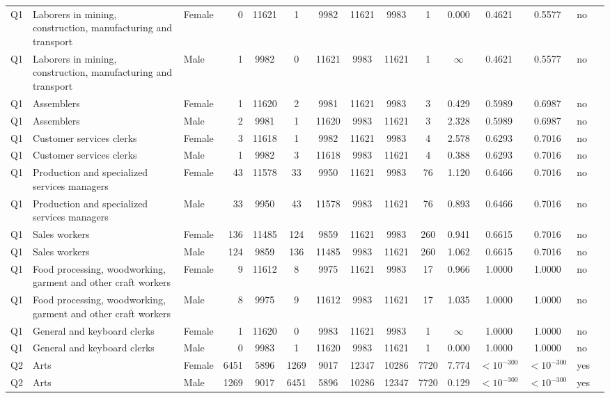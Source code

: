 \begin{longtable}{lllrcccccccccll}
Q1 & Laborers in mining, construction, manufacturing and transport & Female & 0 & 11621 & 1 & 9982 & 11621 & 9983 & 1 & 0.000 & 0.4621 & 0.5577 & no \\
Q1 & Laborers in mining, construction, manufacturing and transport & Male & 1 & 9982 & 0 & 11621 & 9983 & 11621 & 1 & $\infty$ & 0.4621 & 0.5577 & no \\
Q1 & Assemblers & Female & 1 & 11620 & 2 & 9981 & 11621 & 9983 & 3 & 0.429 & 0.5989 & 0.6987 & no \\
Q1 & Assemblers & Male & 2 & 9981 & 1 & 11620 & 9983 & 11621 & 3 & 2.328 & 0.5989 & 0.6987 & no \\
Q1 & Customer services clerks & Female & 3 & 11618 & 1 & 9982 & 11621 & 9983 & 4 & 2.578 & 0.6293 & 0.7016 & no \\
Q1 & Customer services clerks & Male & 1 & 9982 & 3 & 11618 & 9983 & 11621 & 4 & 0.388 & 0.6293 & 0.7016 & no \\
Q1 & Production and specialized services managers & Female & 43 & 11578 & 33 & 9950 & 11621 & 9983 & 76 & 1.120 & 0.6466 & 0.7016 & no \\
Q1 & Production and specialized services managers & Male & 33 & 9950 & 43 & 11578 & 9983 & 11621 & 76 & 0.893 & 0.6466 & 0.7016 & no \\
Q1 & Sales workers & Female & 136 & 11485 & 124 & 9859 & 11621 & 9983 & 260 & 0.941 & 0.6615 & 0.7016 & no \\
Q1 & Sales workers & Male & 124 & 9859 & 136 & 11485 & 9983 & 11621 & 260 & 1.062 & 0.6615 & 0.7016 & no \\
Q1 & Food processing, woodworking, garment and other craft workers & Female & 9 & 11612 & 8 & 9975 & 11621 & 9983 & 17 & 0.966 & 1.0000 & 1.0000 & no \\
Q1 & Food processing, woodworking, garment and other craft workers & Male & 8 & 9975 & 9 & 11612 & 9983 & 11621 & 17 & 1.035 & 1.0000 & 1.0000 & no \\
Q1 & General and keyboard clerks & Female & 1 & 11620 & 0 & 9983 & 11621 & 9983 & 1 & $\infty$ & 1.0000 & 1.0000 & no \\
Q1 & General and keyboard clerks & Male & 0 & 9983 & 1 & 11620 & 9983 & 11621 & 1 & 0.000 & 1.0000 & 1.0000 & no \\
Q2 & Arts & Female & 6451 & 5896 & 1269 & 9017 & 12347 & 10286 & 7720 & 7.774 & $<10^{-300}$ & $<10^{-300}$ & yes \\
Q2 & Arts & Male & 1269 & 9017 & 6451 & 5896 & 10286 & 12347 & 7720 & 0.129 & $<10^{-300}$ & $<10^{-300}$ & yes \\

\end{longtable}
